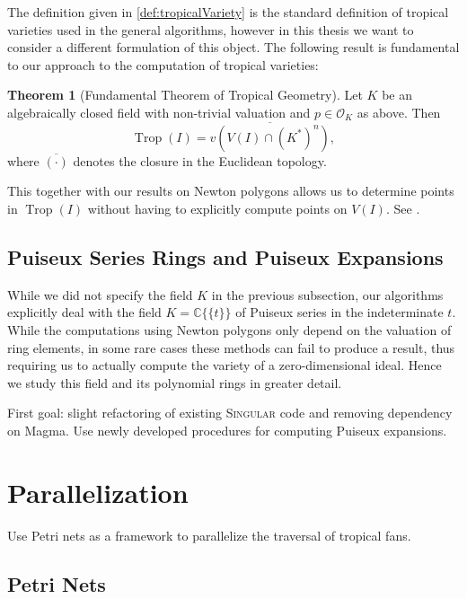 \documentclass[
  paper=a4,
  DIV=14,
  fontsize=12pt,
  titlepage,
  bibliography=totoc,
  pagesize=pdftex
]{scrartcl}
\numberwithin{figure}{section}
\numberwithin{equation}{section}
\numberwithin{table}{section}
\newcommand*\setC{\mathds{C}}
\newcommand*\puiseux[2]{#1\{\!\{#2\}\!\}}
\newcommand*\CCt{\puiseux{\setC}{t}}
\DeclareMathOperator{\Trop}{Trop}
\theoremstyle{definition}
\newtheorem{theorem}[definition]{Theorem}
\numberwithin{definition}{section}
\begin{document}
The definition given in \ref{def:tropicalVariety} is the standard definition of tropical
varieties used in the general algorithms, however in this thesis we want to consider a
different formulation of this object. The following result is fundamental to our approach
to the computation of tropical varieties:

\begin{theorem}[Fundamental Theorem of Tropical Geometry]
  Let $K$ be an algebraically closed field with non-trivial valuation and $p\in \mathcal
  O_K$ as above. Then
  \[
    \Trop(I) = \overline{v(V(I) \cap (K^\ast)^n)},
  \]
  where $\overline{(\cdot)}$ denotes the closure in the Euclidean topology.
  \label{thm:fundamentalThmTropicalGeometry}
\end{theorem}

This together with our results on Newton polygons allows us to determine points in
$\Trop(I)$ without having to explicitly compute points on $V(I)$. See \cite{compTropVar}.

\subsection{Puiseux Series Rings and Puiseux Expansions}

While we did not specify the field $K$ in the previous subsection, our algorithms
explicitly deal with the field $K = \CCt$ of Puiseux series in the indeterminate
$t$. While the computations using Newton polygons only depend on the valuation of ring
elements, in some rare cases these methods can fail to produce a result, thus requiring us
to actually compute the variety of a zero-dimensional ideal. Hence we study this field and
its polynomial rings in greater detail.

First goal: slight refactoring of existing \textsc{Singular} code and removing dependency on
Magma. Use newly developed procedures for computing Puiseux expansions.

\section{Parallelization}

Use Petri nets as a framework to parallelize the traversal of tropical fans.

\subsection{Petri Nets}
\end{document}
